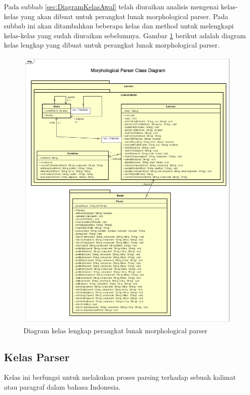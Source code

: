 Pada subbab \ref{sec:DiagramKelasAwal} telah diuraikan analisis mengenai kelas-kelas yang akan dibuat untuk perangkat lunak morphological parser. Pada subbab ini akan ditambahkan beberapa kelas dan method untuk melengkapi kelas-kelas yang sudah diuraikan sebelumnya. Gambar \ref{gambar-diagram-kelas-final} berikut adalah diagram kelas lengkap yang dibuat untuk perangkat lunak morphological parser.

\begin{figure}[H]
\centering
\includegraphics[scale=0.4]{Gambar/gambar-diagram-kelas-final}
\caption{Diagram kelas lengkap perangkat lunak morphological parser} 
\label{gambar-diagram-kelas-final}
\end{figure}

\subsection{Kelas Parser}
\label{sec:kelasParser}

Kelas ini berfungsi untuk melakukan proses parsing terhadap sebuah kalimat atau paragraf dalam bahasa Indonesia.

